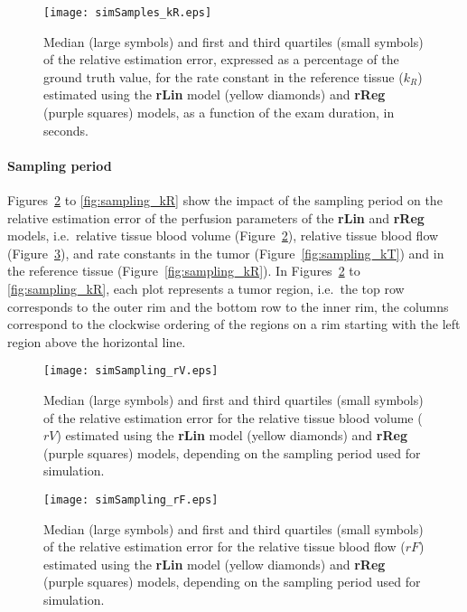 \begin{figure}
\texttt{[image: simSamples\_kR.eps]}
\caption{Median (large symbols) and first and third quartiles (small symbols) of the relative estimation error, expressed as a percentage of the ground truth value, for the rate constant in the reference tissue ($k_R$) estimated using the \textbf{rLin} model (yellow diamonds) and \textbf{rReg} (purple squares) models, as a function of the exam duration, in seconds.}
\label{fig:examDuration_kR}
\end{figure}


\paragraph{Sampling period}
Figures~\ref{fig:sampling_rV} to \ref{fig:sampling_kR} show the impact of the sampling period on the relative estimation error of the perfusion parameters of the \textbf{rLin} and \textbf{rReg} models, i.e.~relative tissue blood volume (Figure~\ref{fig:sampling_rV}), relative tissue blood flow (Figure~\ref{fig:sampling_rF}), and rate constants in the tumor (Figure~\ref{fig:sampling_kT}) and in the reference tissue (Figure~\ref{fig:sampling_kR}).
In Figures~\ref{fig:sampling_rV} to \ref{fig:sampling_kR}, each plot represents a tumor region, i.e.~the top row corresponds to the outer rim and the bottom row to the inner rim, the columns correspond to the clockwise ordering of the regions on a rim starting with the left region above the horizontal line.

\begin{figure}
\texttt{[image: simSampling\_rV.eps]}
\caption{Median (large symbols) and first and third quartiles (small symbols) of the relative estimation error for the relative tissue blood volume ($rV$) estimated using the \textbf{rLin} model (yellow diamonds) and \textbf{rReg} (purple squares) models, depending on the sampling period used for simulation.}
\label{fig:sampling_rV}
\end{figure}

\begin{figure}
\texttt{[image: simSampling\_rF.eps]}
\caption{Median (large symbols) and first and third quartiles (small symbols) of the relative estimation error for the relative tissue blood flow ($rF$) estimated using the \textbf{rLin} model (yellow diamonds) and \textbf{rReg} (purple squares) models, depending on the sampling period used for simulation.}
\label{fig:sampling_rF}
\end{figure}

